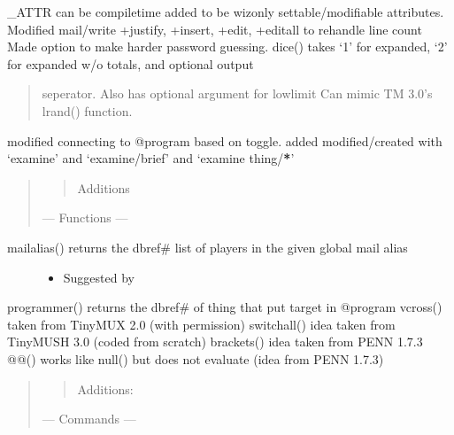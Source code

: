\documentclass[letterpaper,10pt,english]{sphinxmanual}
\begin{document}
\sphinxAtStartPar
\_ATTR can be compile\sphinxhyphen{}time added to be wiz\sphinxhyphen{}only settable/modifiable attributes.
Modified mail/write +justify, +insert, +edit, +editall to rehandle line count
Made option to make harder password guessing.
dice() takes ‘1’ for expanded, ‘2’ for expanded w/o totals, and optional output
\begin{quote}

\sphinxAtStartPar
seperator.  Also has optional argument for low\sphinxhyphen{}limit
Can mimic TM 3.0’s lrand() function.
\end{quote}

\sphinxAtStartPar
modified connecting to @program based on toggle.
added modified/created with ‘examine’ and ‘examine/brief’ and ‘examine thing/{\color{red}\bfseries{}*}’
\begin{quote}
\begin{quote}

\sphinxAtStartPar
Additions
\end{quote}

\sphinxAtStartPar
— Functions —
\end{quote}
\begin{description}
\item[{mailalias() \sphinxhyphen{} returns the dbref\# list of players in the given global mail alias}] \leavevmode\begin{itemize}
\item {} 
\sphinxAtStartPar
Suggested by 

\end{itemize}

\end{description}

\sphinxAtStartPar
programmer() \sphinxhyphen{} returns the dbref\# of thing that put target in @program
vcross() \sphinxhyphen{} taken from TinyMUX 2.0 (with permission)
switchall() \sphinxhyphen{} idea taken from TinyMUSH 3.0 (coded from scratch)
brackets() \sphinxhyphen{} idea taken from PENN 1.7.3
@@() \sphinxhyphen{} works like null() but does not evaluate (idea from PENN 1.7.3)
\begin{quote}
\begin{quote}

\sphinxAtStartPar
Additions:
\end{quote}

\sphinxAtStartPar
— Commands —
\end{quote}
\end{document}
